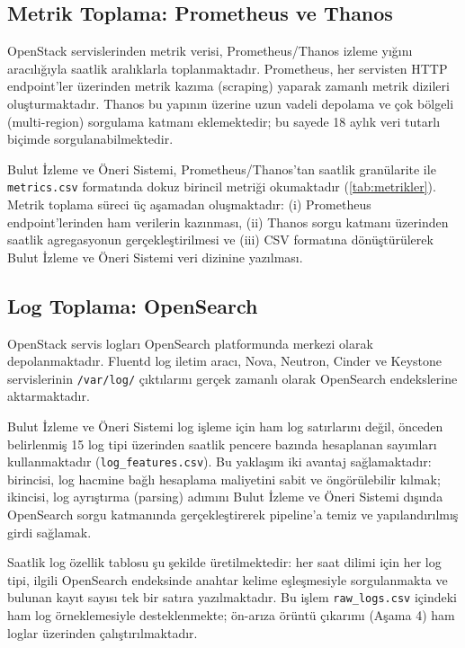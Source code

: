\subsection{Metrik Toplama: Prometheus ve Thanos}

OpenStack servislerinden metrik verisi, Prometheus/Thanos izleme yığını aracılığıyla saatlik aralıklarla toplanmaktadır.
Prometheus, her servisten HTTP endpoint'ler üzerinden metrik kazıma (scraping) yaparak zamanlı metrik dizileri oluşturmaktadır.
Thanos bu yapının üzerine uzun vadeli depolama ve çok bölgeli (multi-region) sorgulama katmanı eklemektedir; bu sayede 18 aylık veri tutarlı biçimde sorgulanabilmektedir.

Bulut İzleme ve Öneri Sistemi, Prometheus/Thanos'tan saatlik granülarite ile \texttt{metrics.csv} formatında dokuz birincil metriği okumaktadır (\autoref{tab:metrikler}).
Metrik toplama süreci üç aşamadan oluşmaktadır: (i) Prometheus endpoint'lerinden ham verilerin kazınması, (ii) Thanos sorgu katmanı üzerinden saatlik agregasyonun gerçekleştirilmesi ve (iii) CSV formatına dönüştürülerek Bulut İzleme ve Öneri Sistemi veri dizinine yazılması.

\subsection{Log Toplama: OpenSearch}

OpenStack servis logları OpenSearch platformunda merkezi olarak depolanmaktadır.
Fluentd log iletim aracı, Nova, Neutron, Cinder ve Keystone servislerinin \texttt{/var/log/} çıktılarını gerçek zamanlı olarak OpenSearch endekslerine aktarmaktadır.

Bulut İzleme ve Öneri Sistemi log işleme için ham log satırlarını değil, önceden belirlenmiş 15 log tipi üzerinden saatlik pencere bazında hesaplanan sayımları kullanmaktadır (\texttt{log\_features.csv}).
Bu yaklaşım iki avantaj sağlamaktadır: birincisi, log hacmine bağlı hesaplama maliyetini sabit ve öngörülebilir kılmak; ikincisi, log ayrıştırma (parsing) adımını Bulut İzleme ve Öneri Sistemi dışında OpenSearch sorgu katmanında gerçekleştirerek pipeline'a temiz ve yapılandırılmış girdi sağlamak.

Saatlik log özellik tablosu şu şekilde üretilmektedir: her saat dilimi için her log tipi, ilgili OpenSearch endeksinde anahtar kelime eşleşmesiyle sorgulanmakta ve bulunan kayıt sayısı tek bir satıra yazılmaktadır.
Bu işlem \texttt{raw\_logs.csv} içindeki ham log örneklemesiyle desteklenmekte; ön-arıza örüntü çıkarımı (Aşama 4) ham loglar üzerinden çalıştırılmaktadır.

